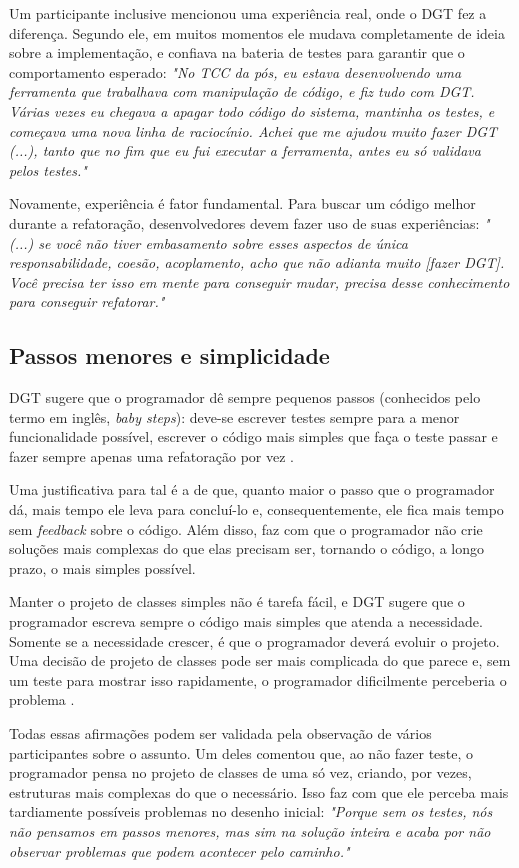 Um participante inclusive mencionou uma experiência real, onde o DGT fez a diferença. Segundo ele,
em muitos momentos ele mudava completamente de ideia sobre a implementação, e confiava na bateria
de testes para garantir que o comportamento esperado:
\textit{"No TCC da pós, eu estava desenvolvendo uma ferramenta que trabalhava com manipulação de código, e fiz
tudo com DGT. Várias vezes eu chegava a apagar todo código do sistema, mantinha os testes, e começava uma nova
linha de raciocínio. Achei que me ajudou muito fazer DGT (...), tanto que no fim que eu fui executar a ferramenta,
antes eu só validava pelos testes."}

Novamente, experiência é fator fundamental. Para buscar um código melhor durante a refatoração,
desenvolvedores devem fazer uso de suas experiências:
\textit{"(...) se você não tiver embasamento sobre esses aspectos de única responsabilidade,
coesão, acoplamento, acho que não adianta muito [fazer DGT]. Você precisa ter isso em mente
para conseguir mudar, precisa desse conhecimento para conseguir refatorar."}

\subsection{Passos menores e simplicidade}

DGT sugere que o programador dê sempre pequenos passos (conhecidos pelo termo em
inglês, \textit{baby steps}): deve-se escrever testes sempre para a menor
funcionalidade possível, escrever o código mais simples que faça o teste passar
e fazer sempre apenas uma refatoração por vez \cite{TDDByExample}.

Uma justificativa para tal é a de que, quanto maior o passo que o programador dá, mais
tempo ele leva para concluí-lo e, consequentemente, ele fica mais tempo
sem \textit{feedback} sobre o código. Além disso, faz com que o programador não crie
soluções mais complexas do que elas precisam ser, tornando o código, a longo
prazo, o mais simples possível.

Manter o projeto de classes simples não é tarefa fácil, e DGT sugere que o programador
escreva sempre o código mais simples que atenda a necessidade. Somente se a
necessidade crescer, é que o programador deverá evoluir o projeto. Uma decisão de
projeto de classes pode ser mais complicada do que parece e, sem um teste para mostrar isso
rapidamente, o programador dificilmente perceberia o problema \cite{aim-fire}.

Todas essas afirmações podem ser validada pela observação de vários participantes sobre o assunto.
Um deles comentou que,
ao não fazer teste, o programador pensa no projeto de classes de uma só vez, criando, por vezes,
estruturas mais complexas do que o necessário. Isso faz com que ele perceba mais tardiamente
possíveis problemas no desenho inicial:
\textit{"Porque sem os testes, nós não pensamos em passos menores, mas sim na solução inteira
e acaba por não observar problemas que podem acontecer pelo caminho."}

